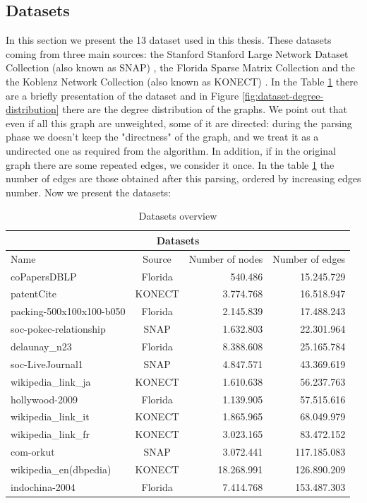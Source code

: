 \subsection{Datasets}
In this section we present the 13 dataset used in this thesis. These datasets coming from three main sources: the Stanford Stanford Large Network Dataset Collection (also known as SNAP) \cite{snap}, the Florida Sparse Matrix Collection \cite{florida-matrix} and the the Koblenz Network Collection (also known as KONECT)  \cite{konect}. In the Table \ref{tab:dataset} there are a briefly presentation of the dataset and in Figure \ref{fig:dataset-degree-distribution} there are the degree distribution of the graphs.  We point out that even if all this graph are unweighted, some of it are directed: during the parsing phase we doesn't keep the "directness" of the graph, and we treat it as a undirected one as required from the algorithm. In addition, if in the original graph there are some repeated edges, we consider it once. In the table \ref{tab:dataset} the number of edges are those obtained after this parsing, ordered by increasing edges number. Now we present the datasets:
\begin{table}
	\centering
	\begin{tabular}{ |l||c||r|r|}
		\hline
		\multicolumn{4}{|c|}{Datasets} \\
		\hline
		Name& Source &  Number of nodes  & Number of edges\\
		\hline
		coPapersDBLP & Florida  & 540.486    & 15.245.729\\
		patentCite & KONECT &3.774.768 & 16.518.947 \\
		packing-500x100x100-b050 & Florida & 2.145.839 & 17.488.243 \\
		soc-pokec-relationship & SNAP &1.632.803 & 22.301.964 \\ 
		delaunay\_n23 & Florida &8.388.608 & 25.165.784\\
		soc-LiveJournal1 & SNAP & 4.847.571 & 43.369.619 \\
		wikipedia\_link\_ja & KONECT & 1.610.638 & 56.237.763\\
		hollywood-2009 & Florida &1.139.905 & 57.515.616 \\
		wikipedia\_link\_it & KONECT & 1.865.965 & 68.049.979\\
		wikipedia\_link\_fr & KONECT & 3.023.165 & 83.472.152\\
		com-orkut & SNAP &3.072.441 &117.185.083\\
		wikipedia\_en(dbpedia) & KONECT & 18.268.991 & 126.890.209 \\
		indochina-2004 & Florida & 7.414.768 & 153.487.303 \\
		\hline
	\end{tabular}
	\caption{\label{tab:dataset}Datasets overview}
\end{table} 
